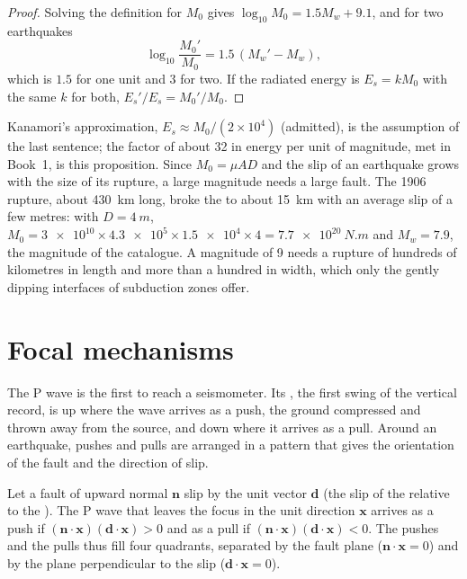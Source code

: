 \begin{proof}
Solving the definition for $M_0$ gives $\log_{10} M_0 = 1.5 M_w + 9.1$,
and for two earthquakes
\[
  \log_{10}\frac{M_0'}{M_0} = 1.5\,(M_w' - M_w) ,
\]
which is $1.5$ for one unit and $3$ for two. If the radiated energy is $E_s = k M_0$ with the same $k$
for both, $E_s'/E_s = M_0'/M_0$.
\end{proof}

Kanamori's approximation, $E_s \approx M_0/(2\times10^4)$ (admitted), is the
assumption of the last sentence; the factor of about 32 in energy per unit of
magnitude, met in Book~1, is this proposition. Since $M_0 = \mu A D$ and the
slip of an earthquake grows with the size of its rupture, a large magnitude
needs a large fault. The 1906 rupture, about \qty{430}{km} long, broke the
 to about \qty{15}{km} with an average slip of a few metres:
with $D = \qty{4}{m}$, $M_0 = \num{3e10}\times\num{4.3e5}\times\num{1.5e4}
\times 4 = \qty{7.7e20}{N.m}$ and $M_w = 7.9$, the magnitude of the catalogue.
A magnitude of 9 needs a rupture of hundreds of kilometres in length and more
than a hundred in width, which only the gently dipping interfaces of
subduction zones offer.

\section{Focal mechanisms}\label{sec:b1:earthquake-source:focal}

The P wave is the first to reach a seismometer. Its , the first
swing of the vertical record, is up where the wave arrives as a push, the
ground compressed and thrown away from the source, and down where it arrives
as a pull. Around an earthquake, pushes and pulls are arranged in a pattern
that gives the orientation of the fault and the direction of slip.

\begin{proposition}\label{prop:b1:earthquake-source:first-motion}
Let a fault of upward normal $\mathbf n$ slip by the unit vector $\mathbf d$
(the slip of the  relative to the ). The P wave that leaves
the focus in the unit direction $\mathbf x$ arrives as a push if
$(\mathbf n\cdot\mathbf x)(\mathbf d\cdot\mathbf x) > 0$ and as a pull if
$(\mathbf n\cdot\mathbf x)(\mathbf d\cdot\mathbf x) < 0$. The pushes and the
pulls thus fill four quadrants, separated by the fault plane
($\mathbf n\cdot\mathbf x = 0$) and by the plane perpendicular to the slip
($\mathbf d\cdot\mathbf x = 0$).
\end{proposition}

